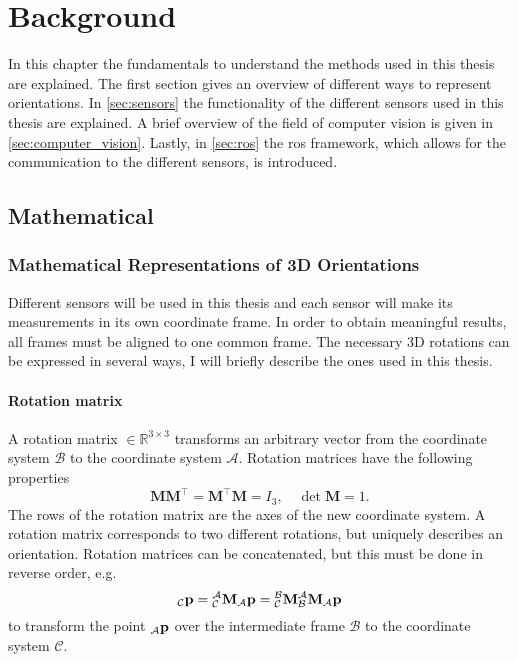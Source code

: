 \chapter{Background}
\label{ch:Background}
In this chapter the fundamentals to understand the methods used in this thesis are explained.
The first section gives an overview of different ways to represent orientations.
In \cref{sec:sensors} the functionality of the different sensors used in this thesis are explained.
A brief overview of the field of computer vision is given in \cref{sec:computer_vision}.
Lastly, in \cref{sec:ros} the \gls{ros} framework, which allows for the communication to the different sensors, is introduced.


\section{Mathematical}
\subsection{Mathematical Representations of 3D Orientations}
Different sensors will be used in this thesis and each sensor will make its measurements in its own coordinate frame.
In order to obtain meaningful results, all frames must be aligned to one common frame.
The necessary 3D rotations can be expressed in several ways, I will briefly describe the ones used in this thesis.

\subsubsection{Rotation matrix}
A rotation matrix  $\in \mathbb{R}^{3\times3}$ transforms an arbitrary vector from the coordinate system $\mathcal{B}$ to the coordinate system $\mathcal{A}$.
Rotation matrices have the following properties
\begin{equation}
	\mathbf{M}\mathbf{M}^\intercal = \mathbf{M}^\intercal \mathbf{M} = I_3, \quad \det \mathbf{M} = 1.
\end{equation}
The rows of the rotation matrix are the axes of the new coordinate system.
A rotation matrix corresponds to two different rotations, but uniquely describes an orientation.
Rotation matrices can be concatenated, but this must be done in reverse order, e.g.
\begin{equation}
	{}_\mathcal{C}\vb{p} = \mtf{a}{c}{}_\mathcal{A}\vb{p} = \mtf{b}{c}\mtf{a}{b}{}_\mathcal{A}\vb{p}
\end{equation}
to transform the point ${}_\mathcal{A}\vb{p}$ over the intermediate frame $\mathcal{B}$ to the coordinate system $\mathcal{C}$.

